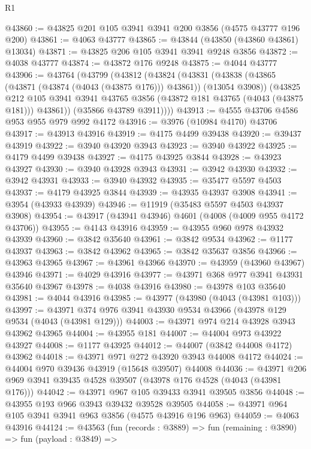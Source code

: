 \begin{lexlean}{R1}
\begin{coremodule}
@43860 := @43825 @201 @105 @3941 @3941 @200 @3856 (@4575 @43777 @196 @200)
@43861 := @4063 @43777
@43865 := @43844 (@43850 (@43860 @43861) @13034)
@43871 := @43825 @206 @105 @3941 @3941 @9248 @3856
@43872 := @4038 @43777
@43874 := @43872 @176 @9248
@43875 := @4044 @43777
@43906 := @43764
    (@43799
      (@43812
        (@43824
          (@43831
            (@43838 (@43865 (@43871 (@43874 (@4043 (@43875 @176))) @43861)) (@13054 @3908))
            (@43825
              @212
              @105
              @3941
              @3941
              @43765
              @3856
              (@43872 @181 @43765 (@4043 (@43875 @181)))
              @43861))
          (@35866 @43789 @3911))))
@43913 := @4555 @43706 @4586 @953 @955 @979 @992 @4172
@43916 := @3976 (@10984 @4170) @43706
@43917 := @43913 @43916
@43919 := @4175 @4499 @39438
@43920 := @39437 @43919
@43922 := @3940 @43920 @3943
@43923 := @3940 @43922
@43925 := @4179 @4499 @39438
@43927 := @4175 @43925 @3844
@43928 := @43923 @43927
@43930 := @3940 @43928 @3943
@43931 := @3942 @43930
@43932 := @3942 @43931
@43933 := @3940 @43932
@43935 := @35477 @5597 @4503
@43937 := @4179 @43925 @3844
@43939 := @43935 @43937 @3908
@43941 := @3954 (@43933 @43939)
@43946 := @11919 (@35483 @5597 @4503 @43937 @3908)
@43954 := @43917 (@43941 @43946) @4601 (@4008 (@4009 @955 @4172 @43706))
@43955 := @4143 @43916
@43959 := @43955 @960 @978 @43932 @43939
@43960 := @3842 @35640
@43961 := @3842 @9534
@43962 := @1177 @43937
@43963 := @3842 @43962
@43965 := @3842 @35637 @3856
@43966 := @43963 @43965
@43967 := @43961 @43966
@43970 := @43959 (@43960 @43967) @43946
@43971 := @4029 @43916
@43977 := @43971 @368 @977 @3941 @43931 @35640 @43967
@43978 := @4038 @43916
@43980 := @43978 @103 @35640
@43981 := @4044 @43916
@43985 := @43977 (@43980 (@4043 (@43981 @103)))
@43997 := @43971 @374 @976 @3941 @43930 @9534 @43966 (@43978 @129 @9534 (@4043 (@43981 @129)))
@44003 := @43971 @974 @214 @43928 @3943 @43962 @43965
@44004 := @43955 @181
@44007 := @44004 @973 @43922 @43927
@44008 := @1177 @43925
@44012 := @44007 (@3842 @44008 @4172) @43962
@44018 := @43971 @971 @272 @43920 @3943 @44008 @4172
@44024 := @44004 @970 @39436 @43919 (@15648 @39507) @44008
@44036 := @43971 @206 @969 @3941 @39435 @4528 @39507 (@43978 @176 @4528 (@4043 (@43981 @176)))
@44042 := @43971 @967 @105 @39433 @3941 @39505 @3856
@44048 := @43955 @193 @966 @3943 @39432 @39528 @39505
@44058 := @43971 @964 @105 @3941 @3941 @963 @3856 (@4575 @43916 @196 @963)
@44059 := @4063 @43916
@44124 := @43563
    (fun (records : @3889) =>
    fun (remaining : @3890) =>
    fun (payload : @3849) =>

\end{coremodule}
\end{lexlean}
